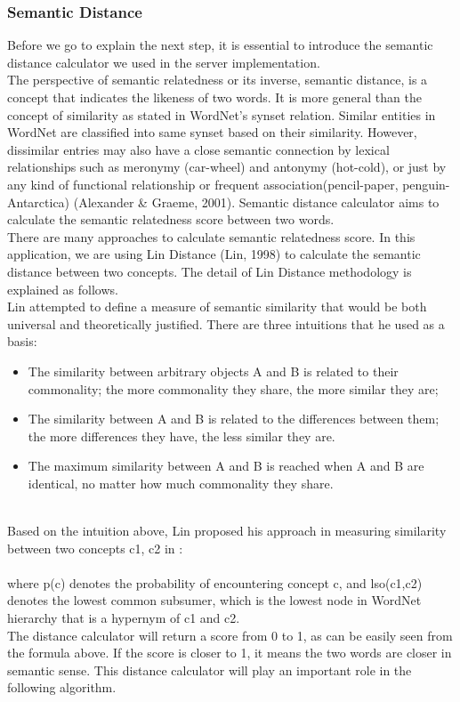 \subsubsection{Semantic Distance}
Before we go to explain the next step, it is essential to introduce the semantic distance calculator we used in the server implementation. 
\\
The perspective of semantic relatedness or its inverse, semantic distance, is a concept that indicates the likeness of two words. It is more general than the concept of similarity as stated in WordNet’s synset relation. Similar entities in WordNet are classified into same synset based on their similarity. However, dissimilar entries may also have a close semantic connection by lexical relationships  such as meronymy (car-wheel) and antonymy (hot-cold), or just by any kind of functional relationship or frequent association(pencil-paper, penguin-Antarctica) (Alexander & Graeme, 2001). Semantic distance calculator aims to calculate the semantic relatedness score between two words.
\\
There are many approaches to calculate semantic relatedness score. In this application, we are using Lin Distance (Lin, 1998) to calculate the semantic distance between two concepts. The detail of Lin Distance methodology is explained as follows.
\\
Lin attempted to define a measure of semantic similarity that would be both universal and theoretically justified. There are three intuitions that he used as a basis:
\begin{itemize}
\item The similarity between arbitrary objects A and B is related to their commonality; the more commonality they share, the more similar they are;
\item The similarity between A and B is related to the differences between them; the more differences they have, the less similar they are.
\item The maximum similarity between A and B is reached when A and B are identical, no matter how much commonality they share. 
\end{itemize}
\\
Based on the intuition above, Lin proposed his approach in measuring similarity between two concepts c1, c2 in :
\\
\\
where p(c) denotes the probability of encountering concept c, and lso(c1,c2) denotes the lowest common subsumer, which is the lowest node in WordNet hierarchy that is a hypernym of c1 and c2. 
\\
The distance calculator will return a score from 0 to 1, as can be easily seen from the formula above. If the score is closer to 1, it means the two words are closer in semantic sense. This distance calculator will play an important role in the following algorithm. 
\\
